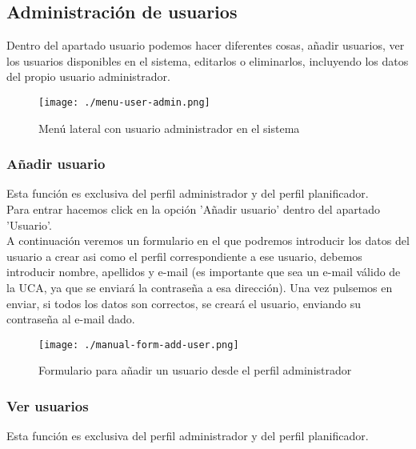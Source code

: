 \subsection{Administración de usuarios}
\label{manual-administracion-usuarios}

Dentro del apartado usuario podemos hacer diferentes cosas, añadir usuarios, ver los usuarios disponibles en el sistema, editarlos o eliminarlos, incluyendo los datos del propio usuario administrador.

\begin{figure}[H] 
  \label{manual-menu-admin} 
	\begin{center}
    \texttt{[image: ./menu-user-admin.png]}
  \end{center}
\caption{Menú lateral con usuario administrador en el sistema}
\end{figure}

\subsubsection{Añadir usuario}
\label{manual-anadir-usuario}
Esta función es exclusiva del perfil administrador y del perfil planificador.\\

Para entrar hacemos click en la opción 'Añadir usuario' dentro del apartado 'Usuario'.\\

A continuación veremos un formulario en el que podremos introducir los datos del usuario a crear asi como el perfil correspondiente a ese usuario, debemos introducir nombre, apellidos y e-mail (es importante que sea un e-mail válido de la UCA, ya que se enviará la contraseña a esa dirección). Una vez pulsemos en enviar, si todos los datos son correctos, se creará el usuario, enviando su contraseña al e-mail dado.

\begin{figure}[H] 
  \label{manual-add-user} 
	\begin{center}
    \texttt{[image: ./manual-form-add-user.png]}
  \end{center}
\caption{Formulario para añadir un usuario desde el perfil administrador}
\end{figure}

\subsubsection{Ver usuarios}
Esta función es exclusiva del perfil administrador y del perfil planificador.\\

